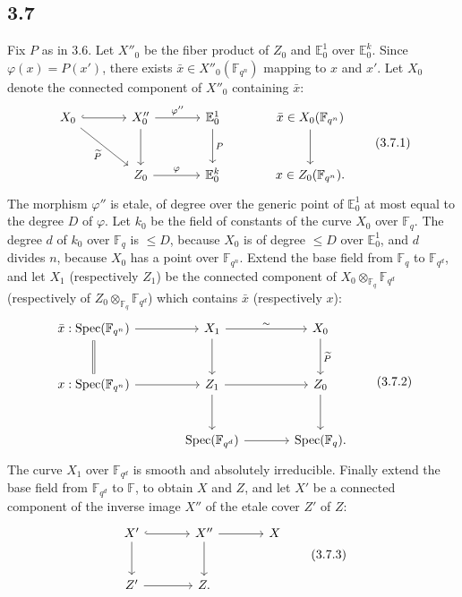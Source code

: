 \documentclass[10pt]{article}
\newcommand{\F}{\mathbb{F}}
\newcommand{\Spec}{\operatorname{Spec}}
\begin{document}
\subsection*{3.7}
Fix $P$ as in 3.6.
Let $X''_0$ be the fiber product of $Z_0$ and $\mathbb E^1_0$ over $\mathbb E^k_0$.
Since $\varphi(x)=P(x')$, there exists $\bar x\in X''_0(\F_{q^n})$ mapping to $x$ and $x'$.
Let $X_0$ denote the connected component of $X''_0$ containing $\bar x$:
\begin{equation}
\begin{tikzcd}[column sep=large,row sep=large]
X_0 \arrow[r,hook] \arrow[dr,"\widetilde P"'] & X''_0 \arrow[r,"\varphi''"] \arrow[d] & \mathbb E^1_0 \arrow[d,"P"] & \bar x\in X_0(\F_{q^n}) \arrow[d]\\
& Z_0 \arrow[r,"\varphi"] & \mathbb E^k_0 & x\in Z_0(\F_{q^n}) .
\end{tikzcd}
\tag{3.7.1}
\end{equation}
The morphism $\varphi''$ is etale, of degree over the generic point of $\mathbb E^1_0$ at most equal to the degree $D$ of $\varphi$.
Let $k_0$ be the field of constants of the curve $X_0$ over $\F_q$.
The degree $d$ of $k_0$ over $\F_q$ is $\le D$, because $X_0$ is of degree $\le D$ over $\mathbb E^1_0$, and $d$ divides $n$, because $X_0$ has a point over $\F_{q^n}$.
Extend the base field from $\F_q$ to $\F_{q^d}$, and let $X_1$ (respectively $Z_1$) be the connected component of $X_0\otimes_{\F_q}\F_{q^d}$ (respectively of $Z_0\otimes_{\F_q}\F_{q^d}$) which contains $\bar x$ (respectively $x$):
\begin{equation}
\begin{tikzcd}[column sep=large,row sep=large]
\bar x:\Spec(\F_{q^n}) \arrow[r] \arrow[d,equal] & X_1 \arrow[r,"\sim"] \arrow[d] & X_0 \arrow[d,"\widetilde P"]\\
x:\Spec(\F_{q^n}) \arrow[r] & Z_1 \arrow[r] \arrow[d] & Z_0 \arrow[d]\\
& \Spec(\F_{q^d}) \arrow[r] & \Spec(\F_q) .
\end{tikzcd}
\tag{3.7.2}
\end{equation}
The curve $X_1$ over $\F_{q^d}$ is smooth and absolutely irreducible.
Finally extend the base field from $\F_{q^d}$ to $\F$, to obtain $X$ and $Z$, and let $X'$ be a connected component of the inverse image $X''$ of the etale cover $Z'$ of $Z$:
\begin{equation}
\begin{tikzcd}[column sep=large,row sep=large]
X' \arrow[r,hook] \arrow[d] & X'' \arrow[r] \arrow[d] & X\\
Z' \arrow[r] & Z . &
\end{tikzcd}
\tag{3.7.3}
\end{equation}
\end{document}
